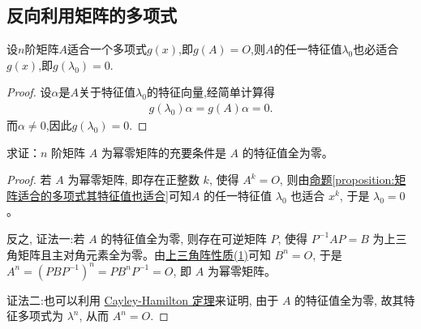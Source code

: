\documentclass[lang=cn,newtx,10pt,scheme=chinese]{elegantbook}
\begin{document}
\subsection{反向利用矩阵的多项式}

\begin{proposition}\label{proposition:矩阵适合的多项式其特征值也适合}
设$n$阶矩阵$A$适合一个多项式$g(x)$,即$g(A) = O$,则$A$的任一特征值$\lambda_0$也必适合$g(x)$,即$g(\lambda_0) = 0$.
\end{proposition}
\begin{proof}
设$\alpha$是$A$关于特征值$\lambda_0$的特征向量,经简单计算得
\begin{align*}
g(\lambda_0) \alpha = g(A) \alpha = 0.
\end{align*}
而$\alpha \neq 0$,因此$g(\lambda_0) = 0$.
\end{proof}

\begin{proposition}[幂零矩阵关于特征值的充要条件]\label{proposition:幂零矩阵关于特征值的充要条件}
求证：$n$ 阶矩阵 $A$ 为幂零矩阵的充要条件是 $A$ 的特征值全为零。
\end{proposition}
\begin{proof}
若 $A$ 为幂零矩阵, 即存在正整数 $k$, 使得 $A^k = O$, 则由\hyperref[proposition:矩阵适合的多项式其特征值也适合]{命题\ref{proposition:矩阵适合的多项式其特征值也适合}}可知$A$ 的任一特征值 $\lambda_0$ 也适合 $x^k$, 于是 $\lambda_0 = 0$。

反之,
{\color{blue}证法一:}若 $A$ 的特征值全为零, 则存在可逆矩阵 $P$, 使得 $P^{-1}AP = B$ 为上三角矩阵且主对角元素全为零。由\hyperref[proposition:上三角阵性质]{上三角阵性质(1)}可知 $B^n = O$, 于是 $A^n = (PBP^{-1})^n = PB^nP^{-1} = O$, 即 $A$ 为幂零矩阵。

{\color{blue}证法二:}也可以利用 \hyperref[theorem:Cayley-Hamilton定理]{Cayley-Hamilton 定理}来证明, 由于 $A$ 的特征值全为零, 故其特征多项式为 $\lambda^n$, 从而 $A^n = O$.
\end{proof}
\end{document}
